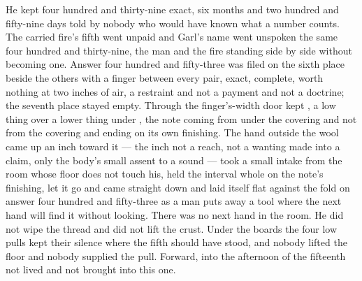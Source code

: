 He kept four hundred and thirty-nine exact, six months and two hundred and fifty-nine days told by nobody who would have known what a number counts. The carried fire's fifth went unpaid and Garl's name went unspoken the same four hundred and thirty-nine, the man and the fire standing side by side without becoming one. Answer four hundred and fifty-three was filed on the sixth place beside the others with a finger between every pair, exact, complete, worth nothing at two inches of air, a restraint and not a payment and not a doctrine; the seventh place stayed empty. Through the finger's-width door  kept , a low thing over a lower thing under , the note coming from under the covering and not from the covering and ending on its own finishing. The hand outside the wool came up an inch toward it --- the inch not a reach, not a wanting made into a claim, only the body's small assent to a sound --- took a small intake from the room whose floor does not touch his, held the interval whole on the note's finishing, let it go and came straight down and laid itself flat against the fold on answer four hundred and fifty-three as a man puts away a tool where the next hand will find it without looking. There was no next hand in the room. He did not wipe the thread and did not lift the crust. Under the boards the four low pulls kept their silence where the fifth should have stood, and nobody lifted the floor and nobody supplied the pull. Forward, into the afternoon of the fifteenth not lived and not brought into this one.
